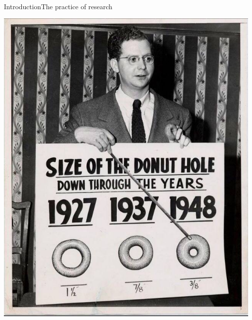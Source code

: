 \documentclass{beamer}
\begin{document}
\begin{frame}{Introduction}{The practice of research}

\centering
\includegraphics[height=.8\textheight,keepaspectratio]{figs/DonutHoleSize.jpg}

\end{frame}
\end{document}
